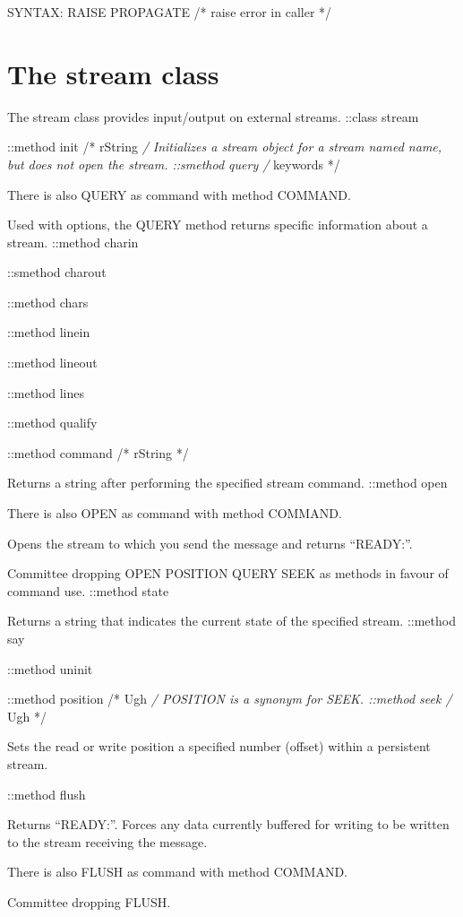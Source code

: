 SYNTAX: RAISE PROPAGATE /* raise error in caller */

\hypertarget{the-stream-class}{%
\section{The stream class}\label{the-stream-class}}

The stream class provides input/output on external streams. ::class
stream

::method init /* rString \emph{/ Initializes a stream object for a
stream named name, but does not open the stream. ::smethod query /}
keywords */

There is also QUERY as command with method COMMAND.

Used with options, the QUERY method returns specific information about a
stream. ::method charin

::smethod charout

::method chars

::method linein

::method lineout

::method lines

::method qualify

::method command /* rString */

Returns a string after performing the specified stream command. ::method
open

There is also OPEN as command with method COMMAND.

Opens the stream to which you send the message and returns ``READY:''.

Committee dropping OPEN POSITION QUERY SEEK as methods in favour of
command use. ::method state

Returns a string that indicates the current state of the specified
stream. ::method say

::method uninit

::method position /* Ugh \emph{/ POSITION is a synonym for SEEK.
::method seek /} Ugh */

Sets the read or write position a specified number (offset) within a
persistent stream.

::method flush

Returns ``READY:''. Forces any data currently buffered for writing to be
written to the stream receiving the message.

There is also FLUSH as command with method COMMAND.

Committee dropping FLUSH.

